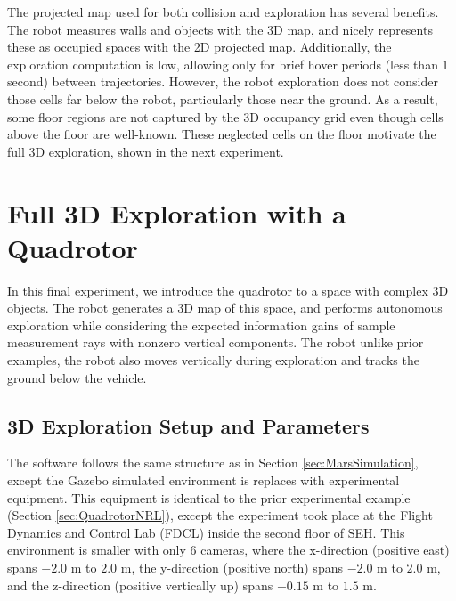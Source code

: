 The projected map used for both collision and exploration has several benefits. The robot measures walls and objects with the 3D map, and nicely represents these as occupied spaces with the 2D projected map. Additionally, the exploration computation is low, allowing only for brief hover periods (less than $1$ second) between trajectories. However, the robot exploration does not consider those cells far below the robot, particularly those near the ground. As a result, some floor regions are not captured by the 3D occupancy grid even though cells above the floor are well-known. These neglected cells on the floor motivate the full 3D exploration, shown in the next experiment.



\section{Full 3D Exploration with a Quadrotor}
\label{sec:QuadrotorSEH}

In this final experiment, we introduce the quadrotor to a space with complex 3D objects. The robot generates a 3D map of this space, and performs autonomous exploration while considering the expected information gains of sample measurement rays with nonzero vertical components. The robot unlike prior examples, the robot also moves vertically during exploration and tracks the ground below the vehicle.

\subsection{3D Exploration Setup and Parameters}
The software follows the same structure as in Section \ref{sec:MarsSimulation}, except the Gazebo simulated environment is replaces with experimental equipment. This equipment is identical to the prior experimental example (Section \ref{sec:QuadrotorNRL}), except the experiment took place at the Flight Dynamics and Control Lab (FDCL) inside the second floor of SEH. This environment is smaller with only $6$ cameras, where the x-direction (positive east) spans $-2.0$ m to $2.0$ m, the y-direction (positive north) spans $-2.0$ m to $2.0$ m, and the z-direction (positive vertically up) spans $-0.15$ m to $1.5$ m.


